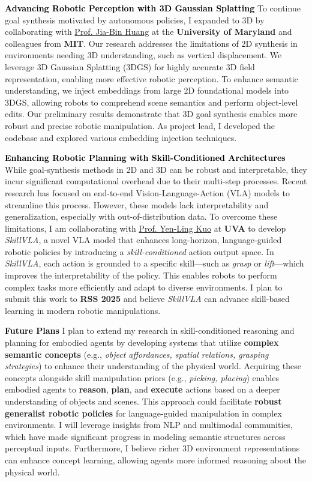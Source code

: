 \documentclass[11pt]{article}
\newcommand{\statement}[1]{\medskip\noindent
  \textcolor{black}{\textbf{#1}}\space
}
\begin{document}
\statement{Advancing Robotic Perception with 3D Gaussian Splatting} To continue goal synthesis motivated by autonomous policies, I expanded to 3D by collaborating with \href{https://jbhuang0604.github.io/}{Prof. Jia-Bin Huang} at the \textbf{University of Maryland} and colleagues from \textbf{MIT}. Our research addresses the limitations of 2D synthesis in environments needing 3D understanding, such as vertical displacement. We leverage 3D Gaussian Splatting (3DGS) for highly accurate 3D field representation, enabling more effective robotic perception. To enhance semantic understanding, we inject embeddings from large 2D foundational models into 3DGS, allowing robots to comprehend scene semantics and perform object-level edits. Our preliminary results demonstrate that 3D goal synthesis enables more robust and precise robotic manipulation. As project lead, I developed the codebase and explored various embedding injection techniques.

\statement{Enhancing Robotic Planning with Skill-Conditioned Architectures} While goal-synthesis methods in 2D and 3D can be robust and interpretable, they incur significant computational overhead due to their multi-step processes. Recent research has focused on end-to-end Vision-Language-Action (VLA) models to streamline this process. However, these models lack interpretability and generalization, especially with out-of-distribution data. To overcome these limitations, I am collaborating with \href{https://yenlingkuo.com/}{Prof. Yen-Ling Kuo} at \textbf{UVA} to develop \textit{SkillVLA}, a novel VLA model that enhances long-horizon, language-guided robotic policies by introducing a \textit{skill-conditioned} action output space. In \textit{SkillVLA}, each action is grounded to a specific skill—such as \textit{grasp} or \textit{lift}—which improves the interpretability of the policy. This enables robots to perform complex tasks more efficiently and adapt to diverse environments. I plan to submit this work to \textbf{RSS 2025} and believe \textit{SkillVLA} can advance skill-based learning in modern robotic manipulations.

\statement{Future Plans} I plan to extend my research in skill-conditioned reasoning and planning for embodied agents by developing systems that utilize \textbf{complex semantic concepts} (e.g., \textit{object affordances, spatial relations, grasping strategies}) to enhance their understanding of the physical world. Acquiring these concepts alongside skill manipulation priors (e.g., \textit{picking, placing}) enables embodied agents to \textbf{reason}, \textbf{plan}, and \textbf{execute} actions based on a deeper understanding of objects and scenes. This approach could facilitate \textbf{robust generalist robotic policies} for language-guided manipulation in complex environments. I will leverage insights from NLP and multimodal communities, which have made significant progress in modeling semantic structures across perceptual inputs. Furthermore, I believe richer 3D environment representations can enhance concept learning, allowing agents more informed reasoning about the physical world.
\end{document}
